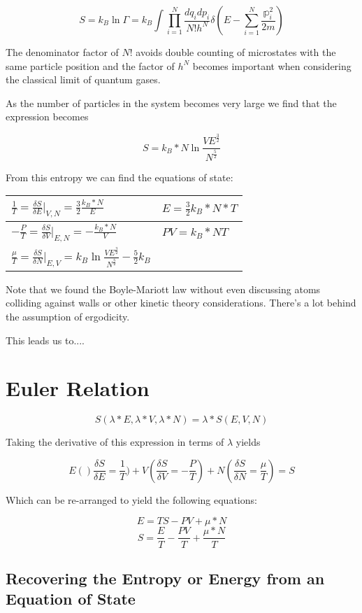 \documentclass{article}
\newcommand{\pardif}[2]{\frac{\delta#1}{\delta#2}}
\newcommand{\thermdif}[4]{\frac{\delta#1}{\delta#2}\vert_{#3,#4}}
\newcommand{\bltz}{k_{B}}
\newcommand{\sumser}[2]{\sum\limits_{#1}^{#2}}
\begin{document}
$$S=\bltz\ln{\Gamma}=\bltz\int\prod_{i=1}^{N}\frac{dq_{i}dp_{i}}{N!h^N}\delta(E-\sumser{i=1}{N}\frac{\mathbb{p}_{i}^2}{2m})$$

The denominator factor of $N!$ avoids double counting of microstates with the same particle position and the factor of $h^{N}$ becomes important when considering the classical limit of quantum gases.

As the number of particles in the system becomes very large we find that the expression becomes

$$S=\bltz*N\ln{\frac{VE^{\frac{3}{2}}}{N^{\frac{5}{2}}}}$$

From this entropy we can find the equations of state:

\begin{tabu} to 0.8\textwidth { | X[l] | X[r] | }
	\hline
	$\frac{1}{T}=\thermdif{S}{E}{V}{N}=\frac{3}{2}\frac{\bltz*N}{E}$ & $E=\frac{3}{2}\bltz*N*T$ \\
	\hline
	$-\frac{P}{T}=\thermdif{S}{V}{E}{N}=-\frac{\bltz*N}{V}$ & $PV=\bltz*NT$ \\
	\hline
	$\frac{\mu}{T}=\thermdif{S}{N}{E}{V}=\bltz\ln{\frac{VE^{\frac{3}{2}}}{N^{\frac{5}{2}}}}-\frac{5}{2}\bltz$ & $ $ \\
	\hline
\end{tabu}

Note that we found the Boyle-Mariott law without even discussing atoms colliding against walls or other kinetic theory considerations.  There's a lot behind the assumption of ergodicity.  

This leads us to....

\section{Euler Relation}

$$S(\lambda*E,\lambda*V,\lambda*N)=\lambda*S(E,V,N)$$

Taking the derivative of this expression in terms of $\lambda$ yields

$$E()\pardif{S}{E}=\frac{1}{T})+V(\pardif{S}{V}=-\frac{P}{T})+N(\pardif{S}{N}=\frac{\mu}{T})=S$$

Which can be re-arranged to yield the following equations:

$$E=TS-PV+\mu*N$$
$$S=\frac{E}{T}-\frac{PV}{T}+\frac{\mu*N}{T}$$

\subsection{Recovering the Entropy or Energy from an Equation of State}
\end{document}

